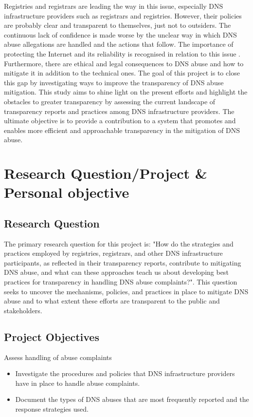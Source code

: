 Registries and registrars are leading the way in this issue, especially DNS infrastructure providers such as registrars and registries. However, their policies are probably clear and transparent to themselves, just not to outsiders. The continuous lack of confidence is made worse by the unclear way in which DNS abuse allegations are handled and the actions that follow. The importance of protecting the Internet and its reliability is recognised in relation to this issue \cite{cerf2022}. Furthermore, there are ethical and legal consequences to DNS abuse and how to mitigate it in addition to the technical ones. The goal of this project is to close this gap by investigating ways to improve the transparency of DNS abuse mitigation. This study aims to shine light on the present efforts and highlight the obstacles to greater transparency by assessing the current landscape of transparency reports and practices among DNS infrastructure providers. The ultimate objective is to provide a contribution to a system that promotes and enables more efficient and approachable transparency in the mitigation of DNS abuse.


\section{Research Question/Project \& Personal objective} 
\subsection{Research Question}

The primary research question for this project is: "How do the strategies and practices employed by registries, registrars, and other DNS infrastructure participants, as reflected in their transparency reports, contribute to mitigating DNS abuse, and what can these approaches teach us about developing best practices for transparency in handling DNS abuse complaints?". This question seeks to uncover the mechanisms, policies, and practices in place to mitigate DNS abuse and to what extent these efforts are transparent to the public and stakeholders.

\subsection{Project Objectives}

Assess handling of abuse complaints

\begin{itemize}
  \item Investigate the procedures and policies that DNS infrastructure providers have in place to handle abuse complaints.
  \item Document the types of DNS abuses that are most frequently reported and the response strategies used.
\end{itemize}

